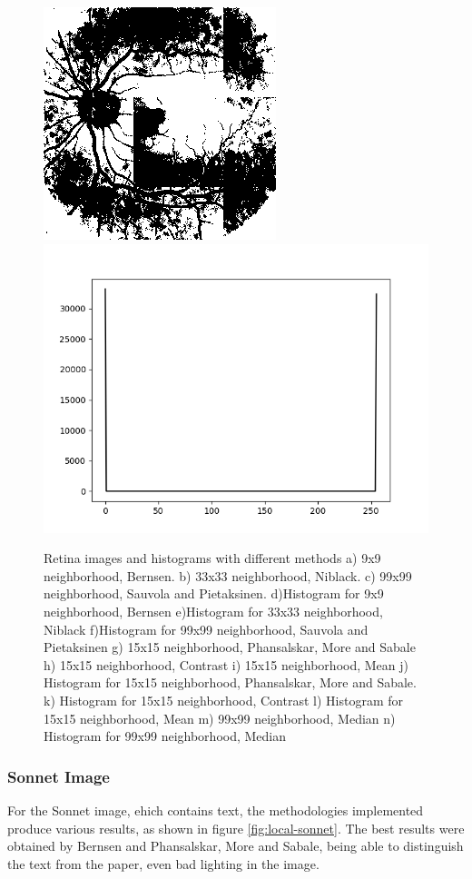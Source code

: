 \documentclass[]{IEEEtran}
\begin{document}
\begin{figure}[h]
  \includegraphics[width=0.3\hsize]{images/99x99-window/retina_median.png}
  \includegraphics[width=0.3\hsize]{images/99x99-window/retina_median_histogram.png}

  \caption{Retina images and histograms with different methods a) 9x9 neighborhood, Bernsen. b) 33x33 neighborhood, Niblack. c) 99x99 neighborhood, Sauvola and Pietaksinen. d)Histogram for 9x9 neighborhood, Bernsen e)Histogram for 33x33 neighborhood, Niblack f)Histogram for 99x99 neighborhood, Sauvola and Pietaksinen g) 15x15 neighborhood, Phansalskar, More and Sabale h) 15x15 neighborhood, Contrast i) 15x15 neighborhood, Mean j) Histogram for 15x15 neighborhood, Phansalskar, More and Sabale. k) Histogram for 15x15 neighborhood, Contrast l) Histogram for 15x15 neighborhood, Mean m) 99x99 neighborhood, Median n) Histogram for 99x99 neighborhood, Median}
  \label{fig:local-retina}
\end{figure}

\subsubsection{Sonnet Image}
For the Sonnet image, ehich contains text, the methodologies implemented produce various results, as shown in figure \ref{fig:local-sonnet}. The best results were obtained by Bernsen and Phansalskar, More and Sabale, being able to distinguish the text from the paper, even bad lighting in the image. 
\end{document}
